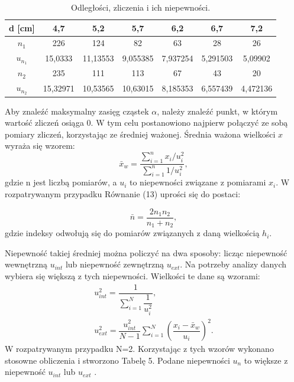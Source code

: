 \documentclass[10pt,a4paper]{article}
\begin{document}
\begin{table}[h!]
\centering
\caption{Odległości, zliczenia i ich niepewności.}
\label{t4}
\begin{tabular}{|c|c|c|c|c|c|c|}
\hline
d [cm]      & 4,7      & 5,2      & 5,7      & 6,2      & 6,7      & 7,2      \\ \hline
$n_{1}$     & 226      & 124      & 82       & 63       & 28       & 26       \\ \hline
$u_{n_{1}}$ & 15,0333  & 11,13553 & 9,055385 & 7,937254 & 5,291503 & 5,09902  \\ \hline
$n_{2}$     & 235      & 111      & 113      & 67       & 43       & 20       \\ \hline
$u_{n_{2}}$ & 15,32971 & 10,53565 & 10,63015 & 8,185353 & 6,557439 & 4,472136 \\ \hline
\end{tabular}
\end{table}

Aby znaleźć maksymalny zasięg cząstek $\alpha$, należy znaleźć punkt, w którym wartość zliczeń osiąga 0. W tym celu postanowiono najpierw połączyć ze sobą pomiary zliczeń, korzystając ze średniej ważonej. Średnia ważona wielkości $x$ wyraża się wzorem:
\begin{equation}
\bar{x}_{w}=\dfrac{\sum_{i=1}^{n}{x_{i}}/{u_{i}^{2}}}{\sum_{i=1}^{n}{1}/{u_{i}^2}},
\end{equation}
gdzie n jest liczbą pomiarów, a $u_{i}$ to niepewności związane z pomiarami $x_{i}$. W rozpatrywanym przypadku Równanie (13) uprości się do postaci:

\begin{equation}
\bar{n}=\dfrac{2n_{1}n_{2}}{n_{1}+n_{2}},
\end{equation}
gdzie indeksy odwołują się do pomiarów związanych z daną wielkością $h_{i}$.

Niepewność takiej średniej można policzyć na dwa sposoby: licząc niepewność wewnętrzną $u_{int}$ lub niepewność zewnętrzną $u_{ext}$. Na potrzeby analizy danych wybiera się większą z tych niepewności. Wielkości te dane są wzorami:
\begin{eqnarray}
 u^{2}_{int}=\dfrac{1}{\sum_{i=1}^{N}\dfrac{1}{u_{i}^2}}, \\
 u^{2}_{ext}=\dfrac{u_{int}^2}{N-1}\sum_{i=1}^{N}\left(\dfrac{x_{i}-\bar{x}_{w}}{u_{i}}\right)^2.
 \end{eqnarray}
 W rozpatrywanym przypadku N=2. Korzystając z tych wzorów wykonano stosowne obliczenia i stworzono Tabelę 5. Podane niepewności $u_{n}$ to większe z niepewność $u_{int}$ lub $u_{ext}$ \cite{tay4}.
\end{document}

